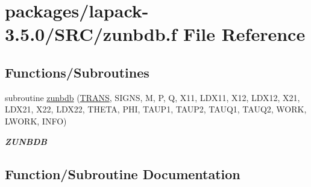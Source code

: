 \hypertarget{zunbdb_8f}{}\section{packages/lapack-\/3.5.0/\+S\+R\+C/zunbdb.f File Reference}
\label{zunbdb_8f}
\subsection*{Functions/\+Subroutines}
\begin{DoxyCompactItemize}
\item 
subroutine \hyperlink{zunbdb_8f_a1ee855ab46a6c5eb712e7bab683c0f77}{zunbdb} (\hyperlink{superlu__enum__consts_8h_a0c4e17b2d5cea33f9991ccc6a6678d62a1f61e3015bfe0f0c2c3fda4c5a0cdf58}{T\+R\+A\+N\+S}, S\+I\+G\+N\+S, M, P, Q, X11, L\+D\+X11, X12, L\+D\+X12, X21, L\+D\+X21, X22, L\+D\+X22, T\+H\+E\+T\+A, P\+H\+I, T\+A\+U\+P1, T\+A\+U\+P2, T\+A\+U\+Q1, T\+A\+U\+Q2, W\+O\+R\+K, L\+W\+O\+R\+K, I\+N\+F\+O)
\begin{DoxyCompactList}\small\item\em {\bfseries Z\+U\+N\+B\+D\+B} \end{DoxyCompactList}\end{DoxyCompactItemize}


\subsection{Function/\+Subroutine Documentation}
\hypertarget{zunbdb_8f_a1ee855ab46a6c5eb712e7bab683c0f77}{}
